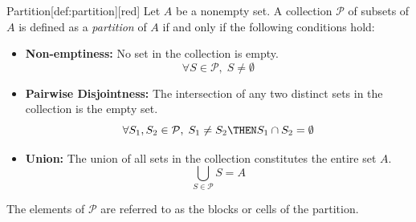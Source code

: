 


















\begin{define}{Partition}[def:partition][red]
  Let $A$ be a nonempty set. A collection $\mathcal{P}$ of subsets of $A$ is defined as a \emph{partition} of $A$ if and only if the following conditions hold:
  \begin{itemize}
    \item[\textbf{1.}] \textbf{Non-emptiness:} No set in the collection is empty.
      $$ \forall S \in \mathcal{P}, \; S \neq \emptyset $$
    \item[\textbf{2.}] \textbf{Pairwise Disjointness:} The intersection of any two distinct sets in the collection is the empty set.
      $$ \forall S_1, S_2 \in \mathcal{P}, \; S_1 \neq S_2 \THEN S_1 \cap S_2 = \emptyset $$
    \item[\textbf{3.}] \textbf{Union:} The union of all sets in the collection constitutes the entire set $A$.
      $$ \bigcup_{S \in \mathcal{P}} S = A $$
  \end{itemize}
  The elements of $\mathcal{P}$ are referred to as the blocks or cells of the partition.
\end{define}

